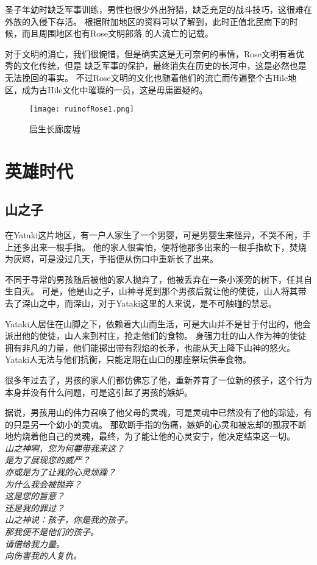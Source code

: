 \documentclass[UTF8,12pt]{ctexbook}
\begin{document}
            圣子年幼时缺乏军事训练，男性也很少外出狩猎，缺乏充足的战斗技巧，这很难在外族的入侵下存活。
            根据附加地区的资料可以了解到，此时正值北民南下的时候，而且周围地区也有Rose文明部落
            的人流亡的记载。

            对于文明的消亡，我们很惋惜，但是确实这是无可奈何的事情，Rose文明有着优秀的文化传统，但是
            缺乏军事的保护，最终消失在历史的长河中，这是必然也是无法挽回的事实。
            不过Rose文明的文化也随着他们的流亡而传遍整个古Hile地区，成为古Hile文化中璀璨的一员，这是毋庸置疑的。
            \newpage
            \begin{figure}[!h]
                \centering
                \texttt{[image: ruinofRose1.png]}
                \caption{启生长廊废墟}
            \end{figure}




    \chapter{英雄时代}
        \section{山之子}
            在Yataki这片地区，有一户人家生了一个男婴，可是男婴生来怪异，不哭不闹，手上还多出来一根手指。
            他的家人很害怕，便将他那多出来的一根手指砍下，焚烧为灰烬，可是没过几天，手指便从伤口中重新长了出来。

            不同于寻常的男孩随后被他的家人抛弃了，他被丢弃在一条小溪旁的树下，任其自生自灭。
            可是，他是山之子，山神寻觅到那个男孩后就让他的使徒，山人将其带去了深山之中，而深山，对于Yataki这里的人来说，是不可触碰的禁忌。

            Yataki人居住在山脚之下，依赖着大山而生活，可是大山并不是甘于付出的，他会派出他的使徒，山人来到村庄，抢走他们的食物。
            身强力壮的山人作为神的使徒拥有非凡的力量，他们能掷出带有烈焰的长矛，也能从天上降下山神的怒火。Yataki人无法与他们抗衡，只能定期在山口的那座祭坛供奉食物。

            很多年过去了，男孩的家人们都仿佛忘了他，重新养育了一位新的孩子，这个行为本身并没有什么问题，可是这引起了男孩的嫉妒。

            据说，男孩用山的伟力召唤了他父母的灵魂，可是灵魂中已然没有了他的踪迹，有的只是另一个幼小的灵魂。
            那砍断手指的伤痛，嫉妒的心灵和被忘却的孤寂不断地灼烧着他自己的灵魂，最终，为了能让他的心灵安宁，他决定结束这一切。
            \emph{
            \\山之神啊，您为何要带我来这？
            \\是为了展现您的威严？
            \\亦或是为了让我的心灵烦躁？
            \\为什么我会被抛弃？
            \\这是您的旨意？
            \\还是我的罪过？
            \\山之神说：孩子，你是我的孩子。
            \\那我便不是他们的孩子。
            \\请借给我力量。
            \\向伤害我的人复仇。
            }
\end{document}
